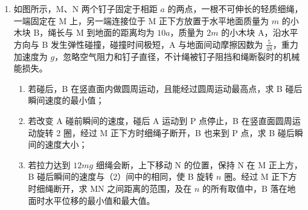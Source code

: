 \documentclass[\gkver]{gaokaozhenti}
\begin{document}
\begin{enumerate}
{\begin{enumerate}
	\item
	$\frac{2\sqrt{3}mv_{0}}{qB}$

	\item
	$\frac{\sqrt{3}m}{qB}$

\end{enumerate}
}

\item
如图所示，M、N 两个钉子固定于相距 $a$ 的两点，一根不可伸长的轻质细绳，一端固定在 M 上，另一端连接位于 M 正下方放置于水平地面质量为 $m$ 的小木块 B，绳长与 M 到地面的距离均为 $10a$，质量为 $2m$ 的小木块 A，沿水平方向与 B 发生弹性碰撞，碰撞时间极短，A 与地面间动摩擦因数为 $\frac{5}{48}$，重力加速度为 $g$，忽略空气阻力和钉子直径，不计绳被钉子阻挡和绳断裂时的机械能损失。
\begin{enumerate}
	\item
	若碰后，B 在竖直面内做圆周运动，且能经过圆周运动最高点，求 B 碰后瞬间速度的最小值；
	\item
	若改变 A 碰前瞬间的速度，碰后 A 运动到 P 点停止，B 在竖直面圆周运动旋转 2 圈，经过 M 正下方时细绳子断开，B 也来到 P 点，求 B 碰后瞬间的速度大小；
	\item
	若拉力达到 $12mg$ 细绳会断，上下移动 N 的位置，保持 N 在 M 正上方，B 碰后瞬间的速度与（2）间中的相同，使 B 旋转 $n$ 圈。经过 M 正下方时细绳断开，求 MN 之间距离的范围，及在 $n$ 的所有取值中，B 落在地面时水平位移的最小值和最大值。
\end{enumerate}
\end{enumerate}
\end{document}
